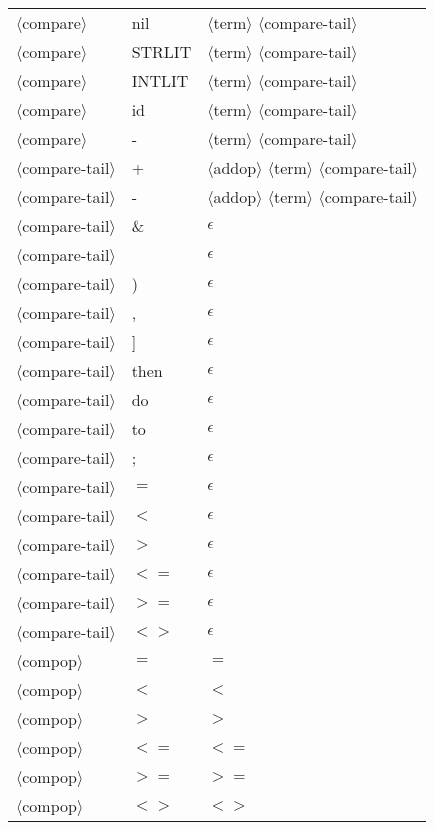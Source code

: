 \documentclass[11pt, fleqn]{article}
\newcommand{\atag}[1]{$\langle$#1$\rangle$}
\begin{document}
\begin{longtable}{l|l|l}
\atag{compare} 					&	nil			&	\atag{term} \atag{compare-tail}	\\
\atag{compare} 					&	STRLIT		&	\atag{term} \atag{compare-tail}	\\
\atag{compare} 					&	INTLIT		&	\atag{term} \atag{compare-tail}	\\
\atag{compare} 					&	id			&	\atag{term} \atag{compare-tail}	\\
\atag{compare} 					&	-			&	\atag{term} \atag{compare-tail}	\\
\atag{compare-tail}				&	+			&	\atag{addop} \atag{term} \atag{compare-tail}	\\
\atag{compare-tail}				&	-			&	\atag{addop} \atag{term} \atag{compare-tail}	\\
\atag{compare-tail}				&	\&			&	$\epsilon$					\\
\atag{compare-tail}				&	\textbar			&	$\epsilon$					\\
\atag{compare-tail}				&	)			&	$\epsilon$					\\
\atag{compare-tail}				&	,			&	$\epsilon$					\\
\atag{compare-tail}				&	]			&	$\epsilon$					\\
\atag{compare-tail}				&	then			&	$\epsilon$					\\
\atag{compare-tail}				&	do			&	$\epsilon$					\\
\atag{compare-tail}				&	to			&	$\epsilon$					\\
\atag{compare-tail}				&	;			&	$\epsilon$					\\
\atag{compare-tail}				&	$=$			&	$\epsilon$					\\
\atag{compare-tail}				&	$<$			&	$\epsilon$					\\
\atag{compare-tail}				&	$>$			&	$\epsilon$					\\
\atag{compare-tail}				&	$<=$			&	$\epsilon$					\\
\atag{compare-tail}				&	$>=$			&	$\epsilon$					\\
\atag{compare-tail}				&	$<>$			&	$\epsilon$						\\
\atag{compop}					&	$=$			&	$=$								\\
\atag{compop}					&	$<$			&	$<$								\\
\atag{compop}					&	$>$			&	$>$								\\
\atag{compop}					&	$<=$			&	$<=$								\\
\atag{compop}					&	$>=$			&	$>=$								\\
\atag{compop}					&	$<>$			&	$<>$								\\

\end{longtable}
\end{document}
